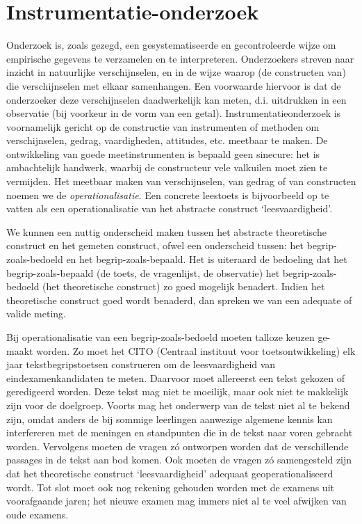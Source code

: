 \documentclass[
]{book}
\begin{document}
\section{Instrumentatie-onderzoek}\label{sec:instrumentatie-onderzoek}

Onderzoek is, zoals gezegd, een gesystematiseerde en gecontroleerde
wijze om empirische gegevens te verzamelen en te interpreteren.
Onderzoekers streven naar inzicht in natuurlijke verschijnselen, en in
de wijze waarop (de constructen van) die verschijnselen met elkaar
samenhangen. Een voorwaarde hiervoor is dat de onderzoeker deze
verschijnselen daadwerkelijk kan meten, d.i. uitdrukken in een
observatie (bij voorkeur in de vorm van een getal).
Instrumentatieonderzoek is voornamelijk gericht op de constructie van
instrumenten of methoden om verschijnselen, gedrag, vaardigheden,
attitudes, etc. meetbaar te maken. De ontwikkeling van goede
meetinstrumenten is bepaald geen sinecure: het is ambachtelijk handwerk,
waarbij de constructeur vele valkuilen moet zien te vermijden. Het
meetbaar maken van verschijnselen, van gedrag of van constructen noemen
we de \emph{operationalisatie}. Een concrete leestoets is bijvoorbeeld op te
vatten als een operationalisatie van het abstracte construct
`leesvaardigheid'.

We kunnen een nuttig onderscheid maken tussen het abstracte theoretische
construct en het gemeten construct, ofwel een onderscheid tussen: het
begrip-zoals-bedoeld en het begrip-zoals-bepaald. Het is uiteraard de
bedoeling dat het begrip-zoals-bepaald (de toets, de vragenlijst, de
observatie) het begrip-zoals-bedoeld (het theoretische construct) zo
goed mogelijk benadert. Indien het theoretische construct goed wordt
benaderd, dan spreken we van een adequate of valide meting.

Bij operationalisatie van een begrip-zoals-bedoeld moeten talloze keuzen
ge-maakt worden. Zo moet het CITO (Centraal instituut voor
toetsontwikkeling) elk jaar tekstbegripstoetsen construeren om de
leesvaardigheid van eindexamenkandidaten te meten. Daarvoor moet
allereerst een tekst gekozen of geredigeerd worden. Deze tekst mag niet
te moeilijk, maar ook niet te makkelijk zijn voor de doelgroep. Voorts
mag het onderwerp van de tekst niet al te bekend zijn, omdat anders de
bij sommige leerlingen aanwezige algemene kennis kan interfereren met de
meningen en standpunten die in de tekst naar voren gebracht worden.
Vervolgens moeten de vragen zó ontworpen worden dat de verschillende
passages in de tekst aan bod komen. Ook moeten de vragen zó samengesteld
zijn dat het theoretische construct `leesvaardigheid' adequaat
geoperationaliseerd wordt. Tot slot moet ook nog rekening gehouden
worden met de examens uit voorafgaande jaren; het nieuwe examen mag
immers niet al te veel afwijken van oude examens.
\end{document}
